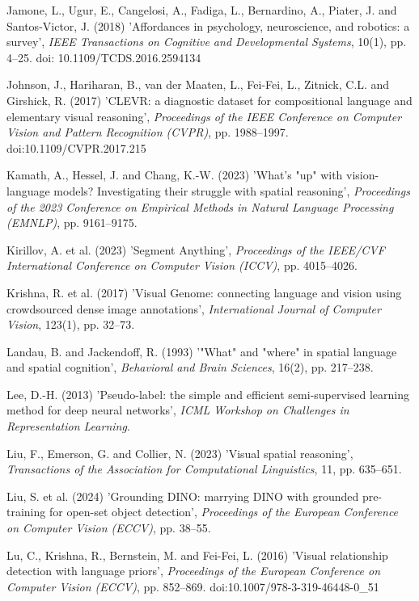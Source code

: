 \begin{description}[leftmargin=2em, labelindent=0em, itemsep=0.1em, parsep=0pt, topsep=0.3em]
\item[] Jamone, L., Ugur, E., Cangelosi, A., Fadiga, L., Bernardino, A., Piater, J. and Santos-Victor, J. (2018) 'Affordances in psychology, neuroscience, and robotics: a survey', \textit{IEEE Transactions on Cognitive and Developmental Systems}, 10(1), pp. 4--25. doi: 10.1109/TCDS.2016.2594134
\item[] Johnson, J., Hariharan, B., van der Maaten, L., Fei-Fei, L., Zitnick, C.L. and Girshick, R. (2017) 'CLEVR: a diagnostic dataset for compositional language and elementary visual reasoning', \textit{Proceedings of the IEEE Conference on Computer Vision and Pattern Recognition (CVPR)}, pp. 1988--1997. doi:10.1109/CVPR.2017.215
\item[] Kamath, A., Hessel, J. and Chang, K.-W. (2023) 'What's "up" with vision-language models? Investigating their struggle with spatial reasoning', \textit{Proceedings of the 2023 Conference on Empirical Methods in Natural Language Processing (EMNLP)}, pp. 9161--9175.
\item[] Kirillov, A. et al. (2023) 'Segment Anything', \textit{Proceedings of the IEEE/CVF International Conference on Computer Vision (ICCV)}, pp. 4015--4026.
\item[] Krishna, R. et al. (2017) 'Visual Genome: connecting language and vision using crowdsourced dense image annotations', \textit{International Journal of Computer Vision}, 123(1), pp. 32--73.
\item[] Landau, B. and Jackendoff, R. (1993) '"What" and "where" in spatial language and spatial cognition', \textit{Behavioral and Brain Sciences}, 16(2), pp. 217--238.
\item[] Lee, D.-H. (2013) 'Pseudo-label: the simple and efficient semi-supervised learning method for deep neural networks', \textit{ICML Workshop on Challenges in Representation Learning}.
\item[] Liu, F., Emerson, G. and Collier, N. (2023) 'Visual spatial reasoning', \textit{Transactions of the Association for Computational Linguistics}, 11, pp. 635--651.
\item[] Liu, S. et al. (2024) 'Grounding DINO: marrying DINO with grounded pre-training for open-set object detection', \textit{Proceedings of the European Conference on Computer Vision (ECCV)}, pp. 38--55.
\item[] Lu, C., Krishna, R., Bernstein, M. and Fei-Fei, L. (2016) 'Visual relationship detection with language priors', \textit{Proceedings of the European Conference on Computer Vision (ECCV)}, pp. 852--869. doi:10.1007/978-3-319-46448-0\_\allowbreak{}51

\end{description}
